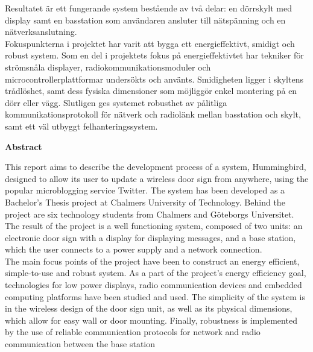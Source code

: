 \documentclass[a4paper,11pt]{article}
\begin{document}
Resultatet är ett fungerande system bestående av två delar: en dörrskylt med display samt en basstation som användaren ansluter till nätspänning och en nätverksanslutning. \\

Fokuspunkterna i projektet har varit att bygga ett energieffektivt, smidigt och robust system. Som en del i projektets fokus på energieffektivtet har tekniker för strömsnåla displayer, radiokommunikationsmoduler och microcontrollerplattformar undersökts och använts. Smidigheten ligger i skyltens trådlöshet, samt dess fysiska dimensioner som möjliggör enkel montering på en dörr eller vägg. Slutligen ges systemet robusthet av pålitliga kommunikationsprotokoll för nätverk och radiolänk mellan basstation och skylt, samt ett väl utbyggt felhanteringssystem.
	

\thispagestyle{empty}
\pagebreak

\thispagestyle{empty}
\begin{center}
{\noindent \bf Abstract}\\
\end{center}

This report aims to describe the development process of a system, Hummingbird, designed to allow its user to update a wireless door sign from anywhere, using the popular microblogging service Twitter. The system has been developed as a Bachelor’s Thesis project at Chalmers University of Technology. Behind the project are six technology students from Chalmers and Göteborgs Universitet. \\

The result of the project is a well functioning system, composed of two units: an electronic door sign with a display for displaying messages, and a base station, which the user connects to a power supply and a network connection. \\

The main focus points of the project have been to construct an energy efficient, simple-to-use and robust system. As a part of the project’s energy efficiency goal, technologies for low power displays, radio communication devices and embedded computing platforms have been studied and used. The simplicity of the system is in the wireless design of the door sign unit, as well as its physical dimensions, which allow for easy wall or door mounting. Finally, robustness is implemented by the use of reliable communication protocols for network and radio communication between the base station 

\thispagestyle{empty}
\pagebreak
\end{document}

